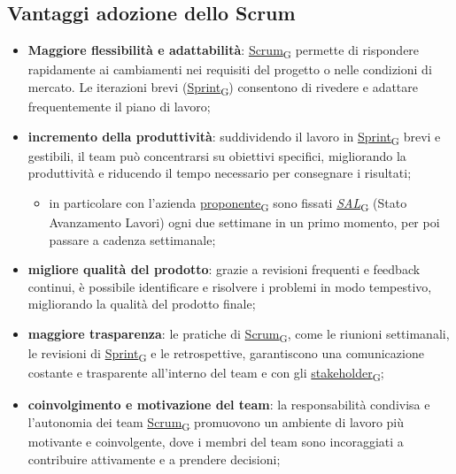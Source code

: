 \subsection{Vantaggi adozione dello Scrum}
\begin{itemize}
	\item \textbf{Maggiore flessibilità e adattabilità}: \href{https://7last.github.io/docs/rtb/documentazione-interna/glossario\#scrum}{Scrum\textsubscript{G}} permette di rispondere rapidamente ai cambiamenti nei requisiti del progetto o nelle condizioni di mercato. Le iterazioni brevi (\href{https://7last.github.io/docs/rtb/documentazione-interna/glossario\#sprint}{Sprint\textsubscript{G}}) consentono di rivedere e adattare frequentemente il piano di lavoro;
	\item \textbf{incremento della produttività}: suddividendo il lavoro in \href{https://7last.github.io/docs/rtb/documentazione-interna/glossario\#sprint}{Sprint\textsubscript{G}} brevi e gestibili, il team può concentrarsi su obiettivi specifici, migliorando la produttività e riducendo il tempo necessario per consegnare i risultati;
	      \begin{itemize}
		      \item in particolare con l’azienda \href{https://7last.github.io/docs/rtb/documentazione-interna/glossario\#proponente}{proponente\textsubscript{G}} sono fissati \href{https://7last.github.io/docs/rtb/documentazione-interna/glossario\#stato-avanzamento-lavori}{\textit{SAL}\textsubscript{G}} (Stato Avanzamento Lavori) ogni due settimane in un primo momento, per poi passare a cadenza settimanale;
	      \end{itemize}
	\item \textbf{migliore qualità del prodotto}: grazie a revisioni frequenti e feedback continui, è possibile identificare e risolvere i problemi in modo tempestivo, migliorando la qualità del prodotto finale;
	\item \textbf{maggiore trasparenza}: le pratiche di \href{https://7last.github.io/docs/rtb/documentazione-interna/glossario\#scrum}{Scrum\textsubscript{G}}, come le riunioni settimanali, le revisioni di \href{https://7last.github.io/docs/rtb/documentazione-interna/glossario\#sprint}{Sprint\textsubscript{G}} e le retrospettive, garantiscono una comunicazione costante e trasparente all'interno del team e con gli \href{https://7last.github.io/docs/rtb/documentazione-interna/glossario\#stakeholder}{stakeholder\textsubscript{G}};
	\item \textbf{coinvolgimento e motivazione del team}: la responsabilità condivisa e l’autonomia dei team \href{https://7last.github.io/docs/rtb/documentazione-interna/glossario\#scrum}{Scrum\textsubscript{G}} promuovono un ambiente di lavoro più motivante e coinvolgente, dove i membri del team sono incoraggiati a contribuire attivamente e a prendere decisioni;

\end{itemize}
